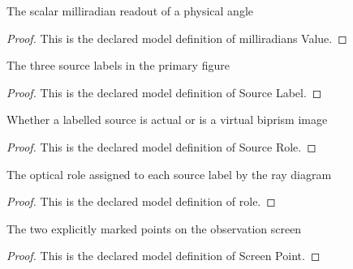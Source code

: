 \begin{definition}
  \label{def:physics:phyx-mini-0121:phyxminiproblems-problemphyxmini0121-milliradiansvalue}
  The scalar milliradian readout of a physical angle
\end{definition}
\begin{proof}
  This is the declared model definition of milliradians Value.
\end{proof}
\begin{definition}
  \label{def:physics:phyx-mini-0121:phyxminiproblems-problemphyxmini0121-sourcelabel}
  The three source labels in the primary figure
\end{definition}
\begin{proof}
  This is the declared model definition of Source Label.
\end{proof}
\begin{definition}
  \label{def:physics:phyx-mini-0121:phyxminiproblems-problemphyxmini0121-sourcerole}
  Whether a labelled source is actual or is a virtual biprism image
\end{definition}
\begin{proof}
  This is the declared model definition of Source Role.
\end{proof}
\begin{definition}[role]
  \label{def:physics:phyx-mini-0121:phyxminiproblems-problemphyxmini0121-sourcelabel-role}
  The optical role assigned to each source label by the ray diagram
\end{definition}
\begin{proof}
  This is the declared model definition of role.
\end{proof}
\begin{definition}
  \label{def:physics:phyx-mini-0121:phyxminiproblems-problemphyxmini0121-screenpoint}
  The two explicitly marked points on the observation screen
\end{definition}
\begin{proof}
  This is the declared model definition of Screen Point.
\end{proof}
